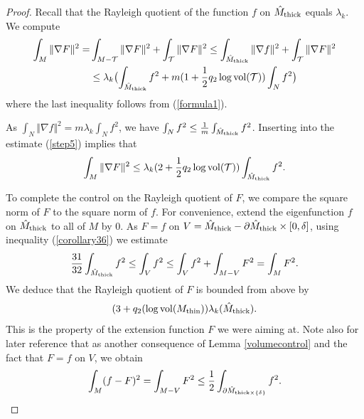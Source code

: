 \documentclass[11pt]{amsart}
\theoremstyle{plain}
\theoremstyle{plain}
\theoremstyle{definition}
\newcommand{\cal}{\mathcal}
\begin{document}
\begin{proof}
Recall that the Rayleigh quotient of the function $f$ on 
$\hat M_{\rm thick}$ equals $\lambda_k$.
We compute
\begin{align}\label{step5}
  \int_M\Vert \nabla F\Vert^2=&
        \int_{M-{\cal T}}\Vert \nabla F\Vert^2+\int_{{\cal T}}
\Vert \nabla F\Vert^2
 \leq \int_{\hat M_{\rm thick}}\Vert \nabla f\Vert^2+
\int_{\cal T}\Vert \nabla F\Vert^2\\
&\leq 
\lambda_k\bigl(\int_{\hat M_{\rm thick}}f^2 +
m(1+\frac{1}{2}q_2\log  {\rm vol}({\cal T}))
                                    \int_Nf^2\bigr)
                                    \notag
\end{align}
where the last inequality follows from (\ref{formula1}). 

As
$\int_N\Vert \nabla f\Vert^2=m\lambda_k \int_N f^2$, we have
$\int_Nf^2\leq \frac{1}{m}\int_{\hat M_{\rm thick}} f^2$. 
Inserting into the estimate (\ref{step5}) 
implies that 
\[\int_{M}\Vert \nabla F\Vert^2\leq 
\lambda_k(2+\frac{1}{2}q_2\log {\rm vol}({\cal T}))\int_{\hat M_{\rm thick}}f^2.\]

To complete the control on the Rayleigh quotient of $F$, we compare
the square norm of $F$ to the square norm of $f$. For convenience, 
extend the eigenfunction $f$ on $\hat M_{\rm thick}$ to all of $M$ by $0$.
As $F=f$ on $V=\hat M_{\rm thick}-\partial \hat M_{\rm thick}\times [0,\delta]$,
using inequality (\ref{corollary36}) we estimate
\begin{equation}\label{normcompare}
  \frac{31}{32}\int_{\hat M_{\rm thick}}f^2 \leq
  \int_{V}f^2
    \leq \int_Vf^2+\int_{M-V}F^2=\int_MF^2.
  \end{equation}
We deduce that 
the Rayleigh 
quotient of $F$ is bounded from above by  
\[(3+q_2(\log {\rm vol}(M_{\rm thin}))\lambda_k(\hat M_{\rm thick}).\]
This is the property of the extension function $F$ we were aiming at.
Note also for later reference that as another consequence of 
Lemma \ref{volumecontrol} and the fact that $F=f$ on $V$, we obtain
\begin{equation}\label{squarenorm2}
\int_M(f-F)^2=\int_{M-V}F^2\leq \frac{1}{2}\int_{\partial 
\hat M_{{\rm thick}\times \{\delta\}}}f^2.
\end{equation}



\end{proof}
\end{document}
